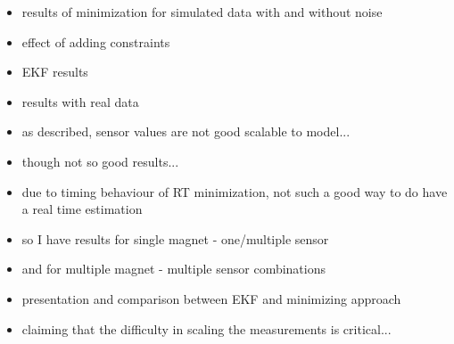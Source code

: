 \begin{itemize}
\item results of minimization for simulated data with and without noise
\item effect of adding constraints
\item EKF results

\item results with real data
\item as described, sensor values are not good scalable to model...
\item though not so good results...
\item due to timing behaviour of RT minimization, not such a good way to do have a real time estimation
\item so I have results for single magnet - one/multiple sensor 
\item and for multiple magnet - multiple sensor combinations
\item presentation and comparison between EKF and minimizing approach
\item claiming that the difficulty in scaling the measurements is critical...

\end{itemize}




